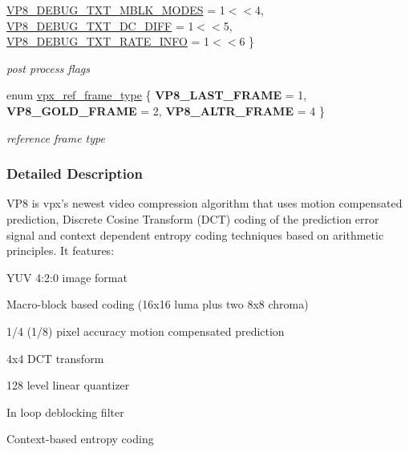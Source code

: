 \begin{DoxyCompactItemize}
\hyperlink{group__vp8_gga99557e20eb37826e6792cd8819121770a9e3fd9032d2556918d0f6d0d1ef46d14}{\-V\-P8\-\_\-\-D\-E\-B\-U\-G\-\_\-\-T\-X\-T\-\_\-\-M\-B\-L\-K\-\_\-\-M\-O\-D\-E\-S} =  1$<$$<$4, 
\hyperlink{group__vp8_gga99557e20eb37826e6792cd8819121770acc0405eaa19b1ed01fb40945cfce4d12}{\-V\-P8\-\_\-\-D\-E\-B\-U\-G\-\_\-\-T\-X\-T\-\_\-\-D\-C\-\_\-\-D\-I\-F\-F} =  1$<$$<$5, 
\hyperlink{group__vp8_gga99557e20eb37826e6792cd8819121770aff0413e7978a7cf8915b8341373751b5}{\-V\-P8\-\_\-\-D\-E\-B\-U\-G\-\_\-\-T\-X\-T\-\_\-\-R\-A\-T\-E\-\_\-\-I\-N\-F\-O} =  1$<$$<$6
 \}
\begin{DoxyCompactList}\small\item\em post process flags \end{DoxyCompactList}\item 
enum \hyperlink{group__vp8_gad8ab72d8a178a68339dad2987358c331}{vpx\-\_\-ref\-\_\-frame\-\_\-type} \{ {\bfseries \-V\-P8\-\_\-\-L\-A\-S\-T\-\_\-\-F\-R\-A\-M\-E} =  1, 
{\bfseries \-V\-P8\-\_\-\-G\-O\-L\-D\-\_\-\-F\-R\-A\-M\-E} =  2, 
{\bfseries \-V\-P8\-\_\-\-A\-L\-T\-R\-\_\-\-F\-R\-A\-M\-E} =  4
 \}
\begin{DoxyCompactList}\small\item\em reference frame type \end{DoxyCompactList}\end{DoxyCompactItemize}


\subsubsection{\-Detailed \-Description}
\-V\-P8 is vpx's newest video compression algorithm that uses motion compensated prediction, \-Discrete \-Cosine \-Transform (\-D\-C\-T) coding of the prediction error signal and context dependent entropy coding techniques based on arithmetic principles. \-It features\-:
\begin{DoxyItemize}
\item \-Y\-U\-V 4\-:2\-:0 image format
\item \-Macro-\/block based coding (16x16 luma plus two 8x8 chroma)
\item 1/4 (1/8) pixel accuracy motion compensated prediction
\item 4x4 \-D\-C\-T transform
\item 128 level linear quantizer
\item \-In loop deblocking filter
\item \-Context-\/based entropy coding 
\end{DoxyItemize}


